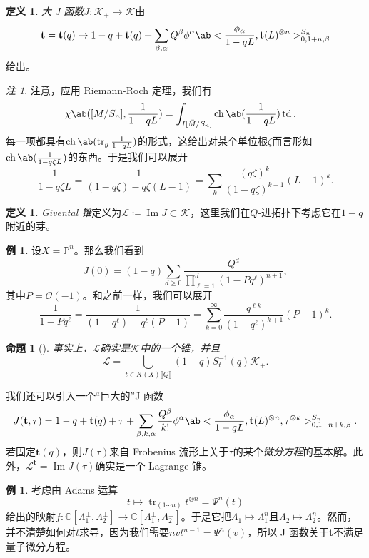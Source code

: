 \documentclass{amsart}
\newtheorem{prop}[thm]{命题}
\theoremstyle{definition}
\newtheorem{defn}[thm]{定义}
\newtheorem{exm}[thm]{例}
\theoremstyle{remark}
\newtheorem{rmk}[thm]{注}
\theoremstyle{plain}
\theoremstyle{definition}
\theoremstyle{remark}
\DeclareMathOperator{\Ima}{Im}
\newcommand{\C}{\mathbb{C}}
\renewcommand{\P}{\mathbb{P}}
\newcommand{\mc}[1]{\mathcal{#1}}
\newcommand{\on}[1]{\operatorname{#1}}
\newcommand{\1}{\mathbf{1}}
\newcommand{\2}{\mathbf{2}}
\newcommand{\3}{\mathbf{3}}
\newcommand{\ps}[1]{\llbracket #1 \rrbracket}
\begin{document}
\begin{defn}
    \textit{大 J 函数}\(J \colon \mc{K}_+ \to \mc{K}\)由
    \[ \mathbf{t} = \mathbf{t}(q) \mapsto 1 - q + \mathbf{t}(q) + \sum_{\beta, \alpha} Q^{\beta} \phi^{\alpha} \ab< \frac{\phi_{\alpha}}{1-qL}, \mathbf{t}(L)^{\otimes n}>_{0, 1+n, \beta}^{S_n} \]
    给出。
\end{defn}

\begin{rmk}
    注意，应用 Riemann-Roch 定理，我们有
    \begin{align*}
        \chi\ab([\bar{M}/S_n], \frac{1}{1-qL}) &= \int_{I[\bar{M}/S_n]} \on{ch}\ab(\frac{1}{1-qL}) \on{td}.
    \end{align*}
    每一项都具有\(\on{ch}\ab(\on{tr}_g \frac{1}{1-qL})\)的形式，这给出对某个单位根\(\zeta\)而言形如\(\on{ch}\ab(\frac{1}{1-q\zeta L})\)的东西。于是我们可以展开
    \[ \frac{1}{1-q\zeta L} = \frac{1}{(1-q \zeta) - q\zeta (L-1)} = \sum_k \frac{(q\zeta)^k}{(1-q\zeta)^{k+1}}(L-1)^k. \]
\end{rmk}

\begin{defn}
    \textit{Givental 锥}定义为\(\mc{L} \coloneqq \Ima J \subset \mc{K}\)，这里我们在\(Q\)-进拓扑下考虑它在\(1-q\)附近的芽。
\end{defn}

\begin{exm}
    设\(X = \P^n\)。那么我们看到
    \[ J(0) = (1-q) \sum_{d \geq 0} \frac{Q^d}{\prod_{\ell=1}^d (1-Pq^{\ell})^{n+1}}, \]
    其中\(P = \mc{O}(-1)\)。和之前一样，我们可以展开
    \[ \frac{1}{1-P q^{\ell}} = \frac{1}{(1-q^{\ell}) - q^{\ell}(P-1)} = \sum_{k=0}^{\infty} \frac{q^{\ell k}}{(1-q^{\ell})^{k+1}}(P-1)^k. \]
\end{exm}

\begin{prop}[{\cite{GiventalK7}}]
    事实上，\(\mc{L}\)确实是\(\mc{K}\)中的一个锥，并且
    \[ \mc{L} = \bigcup_{t \in K(X)\ps{Q}} (1-q) S_{t}^{-1}(q) \mc{K}_+. \]
\end{prop}

我们还可以引入一个“巨大的”J 函数
\[ J(\mathbf{t}, \tau) = 1-q + \mathbf{t}(q) + \tau + \sum_{\beta, k, \alpha} \frac{Q^{\beta}}{k!} \phi^{\alpha} \ab< \frac{\phi_{\alpha}}{1-qL}, \mathbf{t}(L)^{\otimes n}, \tau^{\otimes k}>_{0,1+n+k,\beta}^{S_n}. \]
若固定\(\mathbf{t}(q)\)，则\(J(\tau)\)来自 Frobenius 流形上关于\(\tau\)的某个\textit{微分方程}的基本解。此外，\(\mc{L}^{\mathbf{t}}=  \Ima J(\tau)\)确实是一个 Lagrange 锥。

\begin{exm}
    考虑由 Adams 运算
    \[ t \mapsto \on{tr}_{(1\cdots n)} t^{\otimes n} = \Psi^n (t) \]
    给出的映射\(f \colon \C[\Lambda_1^{\pm}, \Lambda_2^{\pm}] \to \C[\Lambda_1^{\pm}, \Lambda_2^{\pm}]\)。于是它把\(\Lambda_1 \mapsto \Lambda_1^n\)且\(\Lambda_2 \mapsto \Lambda_2^n\)。然而，并不清楚如何对\(t\)求导，因为我们需要\(nv t^{n-1} = \Psi^n(v)\)，所以 J 函数关于\(\mathbf{t}\)不满足量子微分方程。
\end{exm}
\end{document}
